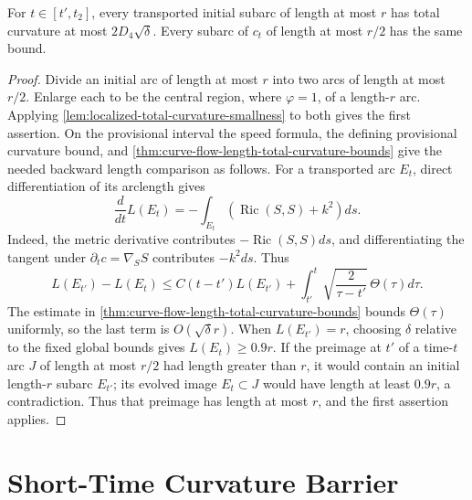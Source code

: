 \begin{theorem}
\label{lem:short-subarc-total-curvature-bound}
\notready
For $t\in[t',t_2]$, every transported initial subarc of length at most $r$
has total curvature at most $2D_4\sqrt\delta$.  Every subarc of $c_t$ of
length at most $r/2$ has the same bound.
\end{theorem}
\begin{proof}
Divide an initial arc of length at most $r$ into two arcs of length at most
$r/2$.  Enlarge each to be the central region, where $\varphi=1$, of a
length-$r$ arc.  Applying
\ref{lem:localized-total-curvature-smallness} to both gives the first
assertion.  On the provisional interval the speed formula, the defining
provisional curvature bound, and
\ref{thm:curve-flow-length-total-curvature-bounds} give the needed backward
length comparison as follows.  For a transported arc $E_t$,
direct differentiation of its arclength gives
\[
 \frac d{dt}L(E_t)
 =-\int_{E_t}(\operatorname{Ric}(S,S)+k^2)ds.
\]
Indeed, the metric derivative contributes $-\operatorname{Ric}(S,S)ds$,
and differentiating the tangent under $\partial_tc=\nabla_SS$ contributes
$-k^2ds$.  Thus
\[
 L(E_{t'})-L(E_t)
 \le C(t-t')L(E_{t'})+
 \int_{t'}^t\sqrt{\frac2{\tau-t'}}\,\Theta(\tau)d\tau.
\]
The estimate in \ref{thm:curve-flow-length-total-curvature-bounds} bounds
$\Theta(\tau)$ uniformly, so the last term is $O(\sqrt\delta r)$.  When
$L(E_{t'})=r$, choosing $\delta$
relative to the fixed global bounds gives $L(E_t)\ge0.9r$.  If the preimage
at $t'$ of a time-$t$ arc $J$ of length at most $r/2$ had length greater
than $r$, it would contain an initial length-$r$ subarc $E_{t'}$; its evolved
image $E_t\subset J$ would have length at least $0.9r$, a contradiction.
Thus that preimage has length at most $r$, and the first assertion applies.
\end{proof}

\section{Short-Time Curvature Barrier}

